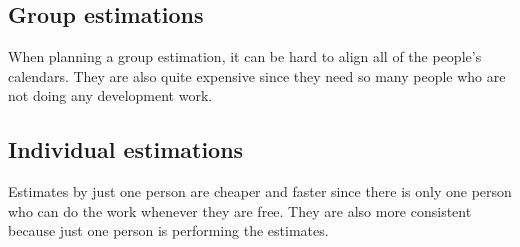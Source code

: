 \subsection{Group estimations}\label{sub:group_estimations}

When planning a group estimation, it can be hard to align all of the people's calendars.
They are also quite expensive since they need so many people who are not doing any development work.

\subsection{Individual estimations}\label{sub:individual_estimations}

Estimates by just one person are cheaper and faster since there is only one person who can do the work whenever they are free.
They are also more consistent because just one person is performing the estimates.
